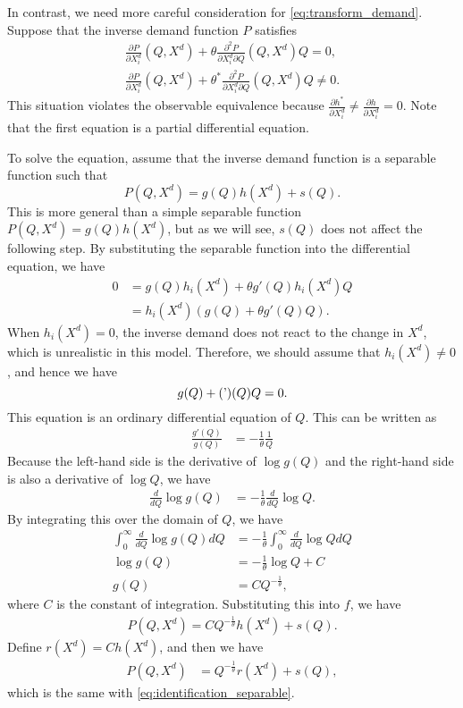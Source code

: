 \documentclass[11pt, a4paper]{article}
\theoremstyle{remark}
\begin{document}

In contrast, we need more careful consideration for \eqref{eq:transform_demand}.
Suppose that the inverse demand function $P$ satisfies
\begin{align}
    \frac{\partial P}{\partial X^{d}_{i}}(Q, X^{d}) + \theta \frac{\partial^2 P}{\partial X^{d}_{i}\partial Q}(Q, X^{d})Q = 0,\\
    \frac{\partial P}{\partial X^{d}_{i}}(Q, X^{d}) + \theta^{*} \frac{\partial^2 P}{\partial X^{d}_{i}\partial Q}(Q, X^{d})Q \ne 0. 
\end{align}
This situation violates the observable equivalence because $\frac{\partial h^{*}}{\partial X^{d}_{i}}  \ne \frac{\partial h}{\partial X^{d}_{i}} =0$.
Note that the first equation is a partial differential equation.


To solve the equation, assume that the inverse demand function is a separable function such that 
\[P(Q, X^{d}) = g(Q)h(X^{d}) + s(Q).\]
This is more general than a simple separable function  $P(Q, X^{d}) = g(Q)h(X^{d})$, but as we will see, $s(Q)$ does not affect the following step.
By substituting the separable function into the differential equation, we have 
\begin{align}
   0 & =  g(Q) h_i(X^{d}) + \theta g'(Q)h_i(X^{d}) Q\\
   & = h_i(X^{d})( g(Q) + \theta g'(Q)Q).
\end{align}
When $h_i(X^{d}) = 0$, the inverse demand does not react to the change in $X^{d}$, which is unrealistic in this model.
Therefore, we should assume that $h_i(X^{d}) \ne 0$, and hence we have 
\[g(Q) + \thetag'(Q)Q = 0.\]
This equation is an ordinary differential equation of $Q$.
This can be written as
\begin{align}
    \frac{g'(Q)}{g(Q)} &= -\frac{1}{\theta} \frac{1}{Q}
\end{align}
Because the left-hand side is the derivative of $\log g(Q)$ and the right-hand side is also a derivative of $\log Q$, we have
\begin{align}
        \frac{d}{dQ} \log g(Q) &= -\frac{1}{\theta} \frac{d}{dQ} \log Q.
\end{align}
By integrating this over the domain of $Q$, we have
\begin{align}
    \int_{0}^\infty \frac{d}{dQ} \log g(Q) dQ &= -\frac{1}{\theta} \int_{0}^\infty  \frac{d}{dQ} \log Q dQ \\
    \log g(Q) &= -\frac{1}{\theta} \log Q + C\\
    g(Q) &= C Q^{-\frac{1}{\theta}},
\end{align}
where $C$ is the constant of integration.
Substituting this into $f$, we have 
\begin{align}
    P(Q, X^{d}) = C Q^{-\frac{1}{\theta}} h(X^{d}) + s(Q).
\end{align}
Define $r(X^{d}) = Ch(X^{d})$, and then we have
\begin{align}
    P(Q, X^{d}) &= Q^{-\frac{1}{\theta}} r(X^{d}) + s(Q),
\end{align}
which is the same with \eqref{eq:identification_separable}.
\end{document}
